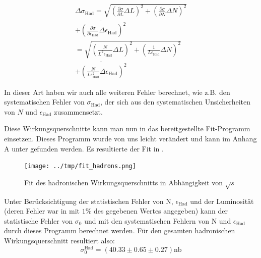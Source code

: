\begin{equation}
  \begin{split}
    \Delta\sigma_\mathrm{Had} =  \sqrt{\left( \frac{\partial\sigma}{\partial L}\Delta L\right)^2 + \left( \frac{\partial\sigma}{\partial N}\Delta N\right)^2} \\
    \overline{+ \left( \frac{\partial\sigma}{\partial \epsilon_\mathrm{Had}}\Delta\epsilon_\mathrm{Had} \right)^2} \\
    = \sqrt{\left( \frac{N}{L^2\epsilon_\mathrm{Had}}\Delta L\right)^2 + \left( \frac{1}{L\epsilon_\mathrm{Had}}\Delta N\right)^2} \\
    \overline{+ \left( \frac{N}{L \epsilon_\mathrm{Had}^2}\Delta\epsilon_\mathrm{Had} \right)^2}
  \end{split}
\end{equation}

In dieser Art haben wir auch alle weiteren Fehler berechnet, wie z.B. den systematischen Fehler von $\sigma_\mathrm{Had}$, der sich aus den systematischen Unsicherheiten von $N$ und $\epsilon_{\mathrm{Had}}$ zusammensetzt.

Diese Wirkungsquerschnitte kann man nun in das bereitgestellte Fit-Programm einsetzen. Dieses Programm wurde von uns leicht verändert und kann im Anhang A unter  gefunden werden. Es resultierte der Fit in .\\
\begin{figure}[htb]
	\centering
	\texttt{[image: ../tmp/fit\_hadrons.png]}
	\caption{Fit des hadronischen Wirkungsquerschnitts in Abhängigkeit von $\sqrt{s}$}
	\label{fig:hadfit}
\end{figure}
Unter Berücksichtigung der statistischen Fehler von N, $\epsilon_\mathrm{Had}$ und der Luminosität (deren Fehler war in \cite[S.9]{script} mit $1\%$ des gegebenen Wertes angegeben) kann der statistische Fehler von $\sigma_0$ und mit den systematischen Fehlern von N und $\epsilon_{\mathrm{Had}}$ durch dieses Programm berechnet werden. Für den gesamten hadronischen Wirkungsquerschnitt resultiert also:
\begin{equation}
\sigma_0^{\mathrm{Had}} = (40.33 \pm 0.65 \pm 0.27) \si{\nano\barn}
\end{equation}

